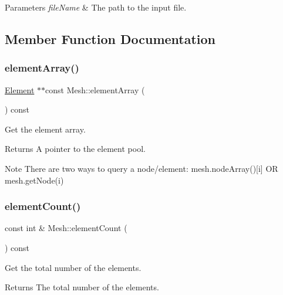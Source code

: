 \begin{DoxyParams}{Parameters}
{\em file\+Name} & The path to the input file. \\
\hline
\end{DoxyParams}


\subsection{Member Function Documentation}
\mbox{\label{class_mesh_a042cc2ef19b7090f830b915721818181}} 
\subsubsection{\texorpdfstring{element\+Array()}{elementArray()}}
{\footnotesize\ttfamily \mbox{\hyperlink{class_element}{Element}} $\ast$$\ast$const Mesh\+::element\+Array (\begin{DoxyParamCaption}{ }\end{DoxyParamCaption}) const}



Get the element array. 

\begin{DoxyReturn}{Returns}
A pointer to the element pool.
\end{DoxyReturn}
\begin{DoxyNote}{Note}
There are two ways to query a node/element\+: mesh.\+node\+Array()\mbox{[}i\mbox{]} OR mesh.\+get\+Node(i) 
\end{DoxyNote}
\mbox{\label{class_mesh_aa1b2aafa40bd4b335e9bf6306e482881}} 
\subsubsection{\texorpdfstring{element\+Count()}{elementCount()}}
{\footnotesize\ttfamily const int \& Mesh\+::element\+Count (\begin{DoxyParamCaption}{ }\end{DoxyParamCaption}) const}



Get the total number of the elements. 

\begin{DoxyReturn}{Returns}
The total number of the elements. 
\end{DoxyReturn}
\mbox{\label{class_mesh_ada2ae7b8640a3999780d7e738ee4154e}} 
